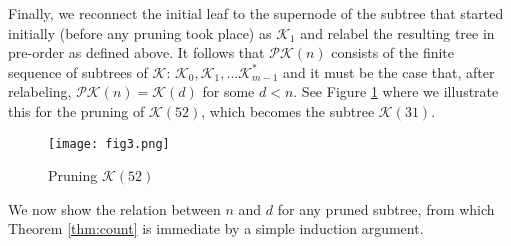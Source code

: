 \documentclass[12pt]{amsart}
\numberwithin{equation}{section}
\numberwithin{theorem}{section}
\numberwithin{table}{section}
\numberwithin{figure}{section}
\begin{document}
Finally, we reconnect the initial leaf to the supernode of the subtree that started initially (before any pruning took place) as ${\mathcal K}_1$ and relabel the resulting tree in pre-order as defined above. It follows that ${\mathcal P} {\mathcal K}(n)$ consists of the finite sequence of subtrees of ${\mathcal K}$: ${\mathcal K}_0, {\mathcal K}_1, \ldots {\mathcal K}^*_{m-1}$ and it must be the case that, after relabeling, ${\mathcal P} {\mathcal K}(n) = {\mathcal K}(d)$ for some $d<n$. See Figure \ref{fig3} where we illustrate this for the pruning of ${\mathcal K}(52)$, which becomes the subtree ${\mathcal K}(31)$.

\begin{figure}[htpb]
\begin{center}
\texttt{[image: fig3.png]}
\caption{Pruning ${\mathcal K}(52)$} \label{fig3}
\end{center}
\end{figure}

We now show the relation between $n$ and $d$ for any pruned subtree, from which Theorem \ref{thm:count} is immediate by a simple induction argument.
\end{document}
